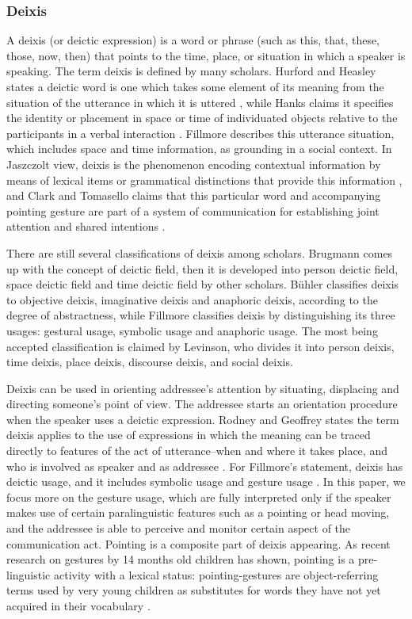 \documentclass[12pt,twoside]{article}
\begin{document}
\subsubsection{Deixis}
A deixis (or deictic expression) is a word or phrase (such as this, that, these, those, now, then) that points to the time, place, or situation in which a speaker is speaking.  The term deixis is defined by many scholars. Hurford and Heasley states a deictic word is one which takes some element of its meaning from the situation of the utterance in which it is uttered \cite{hurford1983coursebook}, while Hanks claims it specifies the identity or placement in space or time of individuated objects relative to the participants in a verbal interaction \cite{hanks1990referential}. Fillmore \cite{fillmore1997lectures} describes this utterance situation, which includes space and time information,  as grounding in a social context. In Jaszczolt view, deixis is the phenomenon encoding contextual information by means of lexical items or grammatical distinctions that provide this information \cite{jaszczolt2005default}, and Clark and Tomasello claims that this particular word and accompanying pointing gesture are part of a system of communication for establishing joint attention and shared intentions \cite{clark2003pointing}\cite{tomasello2007shared}.

There are still several classifications of deixis among scholars. Brugmann comes up with the concept of deictic field, then it is developed into person deictic field, space deictic field and time deictic field by other scholars. Bühler classifies deixis to objective deixis, imaginative deixis and anaphoric deixis, according to the degree of abstractness, while Fillmore classifies deixis by distinguishing its three usages: gestural usage, symbolic usage and anaphoric usage. The most being accepted classification is claimed by Levinson, who divides it into person deixis, time deixis, place deixis, discourse deixis, and social deixis.

Deixis can be used in orienting addressee’s attention by situating, displacing and directing someone’s point of view. The addressee starts an orientation procedure when the speaker uses a deictic expression. Rodney and Geoffrey states the term deixis applies to the use of expressions in which the meaning can be traced directly to features of the act of utterance--when and where it takes place, and who is involved as speaker and as addressee \cite{huddleston2006coordination}. For Fillmore’s statement, deixis has deictic usage, and it includes symbolic usage and gesture usage \cite{fillmore1997lectures}. In this paper, we focus more on the gesture usage, which are fully interpreted only if the speaker makes use of certain paralinguistic features such as a pointing or head moving, and the addressee is able to perceive and monitor certain aspect of the communication act. Pointing is a composite part of deixis appearing. As recent research on gestures by 14 months old children has shown, pointing is a pre-linguistic activity with a lexical status: pointing-gestures are object-referring terms used by very young children as substitutes for words they have not yet acquired in their vocabulary \cite{goldin2007young}.\\
\end{document}
